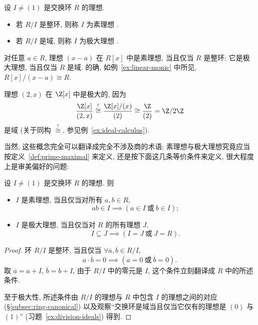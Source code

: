 \begin{definition}
\label{def:prime-maximal}
设 $I \neq (1)$ 是交换环 $R$ 的理想.
\begin{itemize}
	\item 若 $R/I$ 是整环, 则称 $I$ 为素理想%
.
	\item 若 $R/I$ 是域, 则称 $I$ 为极大理想%
.
\end{itemize}
\end{definition}

\begin{example}
\label{ex:xa-prime}
对任意 $a \in R$, 理想 $(x - a)$ 在 $R[x]$ 中是素理想, 当且仅当 $R$ 是整环; 它是极大理想, 当且仅当 $R$ 是域. 的确, 如例~\ref{ex:linear-monic} 中所见, $R[x]/(x - a) \cong R$.

理想 $(2, x)$ 在 $\Z[x]$ 中是极大的, 因为
\[
\frac{\Z[x]}{(2, x)} \overset{!}{\cong} \frac{\Z[x]/(x)}{(2)} \cong \frac{\Z}{(2)} = \Z/2\Z
\]
是域 (关于同构 $\overset{!}{\cong}$, 参见例~\ref{ex:ideal-calculus}).
\end{example}

当然, 这些概念完全可以翻译成完全不涉及商的术语; 素理想与极大理想究竟应当按定义~\ref{def:prime-maximal} 来定义, 还是按下面这几条等价条件来定义, 很大程度上是审美偏好的问题:

\begin{proposition}
\label{prop:prime-maximal-alt}
设 $I \neq (1)$ 是交换环 $R$ 的理想. 则
\begin{itemize}
	\item $I$ 是素理想, 当且仅当对所有 $a, b \in R$,
	\[
	ab \in I \implies (a \in I \ \text{或}\ b \in I);
	\]
	\item $I$ 是极大理想, 当且仅当对 $R$ 的所有理想 $J$,
	\[
	I \subseteq J \implies (I = J \ \text{或}\ J = R).
	\]
\end{itemize}
\end{proposition}

\begin{proof}
环 $R/I$ 是整环, 当且仅当 $\forall \overline{a}, \overline{b} \in R/I$,
\[
\overline{a} \cdot \overline{b} = 0 \implies (\overline{a} = 0 \ \text{或}\ \overline{b} = 0).
\]
取 $\overline{a} = a + I$, $\overline{b} = b + I$, 由于 $R/I$ 中的零元是 $I$, 这个条件立刻翻译成 $R$ 中的所述条件.

至于极大性, 所述条件由 $R/I$ 的理想与 $R$ 中包含 $I$ 的理想之间的对应 (\S\ref{subsec:ring-canonical}) 以及观察``交换环是域当且仅当它仅有的理想是 $(0)$ 与 $(1)$'' (习题~\ref{ex:division-ideals}) 得到.
\end{proof}

